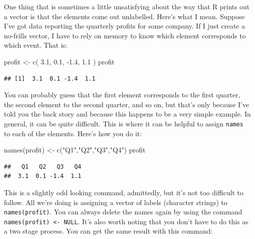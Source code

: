 \documentclass[
]{book}
\newenvironment{Shaded}{\begin{snugshade}}{\end{snugshade}}
\newcommand{\FloatTok}[1]{\textcolor[rgb]{0.00,0.00,0.81}{#1}}
\newcommand{\FunctionTok}[1]{\textcolor[rgb]{0.00,0.00,0.00}{#1}}
\newcommand{\NormalTok}[1]{#1}
\newcommand{\OtherTok}[1]{\textcolor[rgb]{0.56,0.35,0.01}{#1}}
\newcommand{\SpecialCharTok}[1]{\textcolor[rgb]{0.00,0.00,0.00}{#1}}
\newcommand{\StringTok}[1]{\textcolor[rgb]{0.31,0.60,0.02}{#1}}
\begin{document}
One thing that is sometimes a little unsatisfying about the way that R prints out a vector is that the elements come out unlabelled. Here's what I mean. Suppose I've got data reporting the quarterly profits for some company. If I just create a no-frills vector, I have to rely on memory to know which element corresponds to which event. That is:

\begin{Shaded}
\begin{Highlighting}[]
\NormalTok{profit }\OtherTok{\textless{}{-}} \FunctionTok{c}\NormalTok{( }\FloatTok{3.1}\NormalTok{, }\FloatTok{0.1}\NormalTok{, }\SpecialCharTok{{-}}\FloatTok{1.4}\NormalTok{, }\FloatTok{1.1}\NormalTok{ )}
\NormalTok{profit}
\end{Highlighting}
\end{Shaded}

\begin{verbatim}
## [1]  3.1  0.1 -1.4  1.1
\end{verbatim}

You can probably guess that the first element corresponds to the first quarter, the second element to the second quarter, and so on, but that's only because I've told you the back story and because this happens to be a very simple example. In general, it can be quite difficult. This is where it can be helpful to assign \texttt{names} to each of the elements. Here's how you do it:

\begin{Shaded}
\begin{Highlighting}[]
\FunctionTok{names}\NormalTok{(profit) }\OtherTok{\textless{}{-}} \FunctionTok{c}\NormalTok{(}\StringTok{"Q1"}\NormalTok{,}\StringTok{"Q2"}\NormalTok{,}\StringTok{"Q3"}\NormalTok{,}\StringTok{"Q4"}\NormalTok{)}
\NormalTok{profit}
\end{Highlighting}
\end{Shaded}

\begin{verbatim}
##   Q1   Q2   Q3   Q4 
##  3.1  0.1 -1.4  1.1
\end{verbatim}

This is a slightly odd looking command, admittedly, but it's not too difficult to follow. All we're doing is assigning a vector of labels (character strings) to \texttt{names(profit)}. You can always delete the names again by using the command \texttt{names(profit)\ \textless{}-\ NULL}. It's also worth noting that you don't have to do this as a two stage process. You can get the same result with this command:
\end{document}
